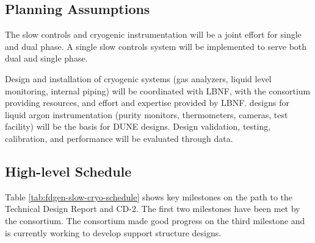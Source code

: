 \subsection{Planning Assumptions}
\label{sec:fdgen-slow-cryo-org-assmp}

The slow controls and cryogenic instrumentation will be a joint effort for single and dual phase.
A single slow controls system will be implemented to serve both dual and single phase.

Design and installation of cryogenic systems (gas analyzers, liquid level monitoring, internal piping) will be coordinated with LBNF, with the consortium providing resources, and effort and expertise provided by LBNF.
 designs for liquid argon instrumentation (purity monitors, thermometers, cameras, test facility) will be the basis for DUNE designs. Design validation, testing, calibration, and performance will be evaluated through  data.



\subsection{High-level Schedule}
\label{sec:fdgen-slow-cryo-org-cs}

Table \ref{tab:fdgen-slow-cryo-schedule} shows key milestones on
the path to the Technical Design Report and CD-2. The first two milestones have been met by the consortium.
The consortium made good progress on the third milestone and is currently working to develop support structure designs.

